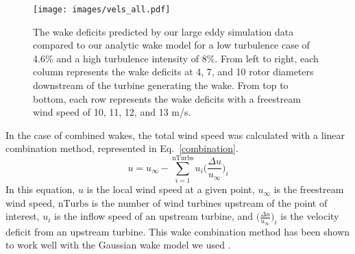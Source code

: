 \documentclass[11pt,letterpaper]{article}
\begin{document}
% 
\begin{figure}
    \centering
    \texttt{[image: images/vels\_all.pdf]}
    \caption{The wake deficits predicted by our large eddy simulation data compared to our analytic wake model for a low turbulence case of 4.6\% and a high turbulence intensity of 8\%. From left to right, each column represents the wake deficits at 4, 7, and 10 rotor diameters downstream of the turbine generating the wake. From top to bottom, each row represents the wake deficits with a freestream wind speed of 10, 11, 12, and 13 m/s.}
    \label{vels_all}
\end{figure}

In the case of combined wakes, the total wind speed was calculated with a linear combination method, represented in Eq.~\ref{combination}.
%
\begin{equation}
    \label{combination}
    u = u_\infty - \sum_{i=1}^\text{nTurbs} u_i \Big(\frac{\Delta u}{u_{\infty}}\Big)_i
\end{equation}
% 
In this equation, $u$ is the local wind speed at a given point, $u_\infty$ is the freestream wind speed, $\text{nTurbs}$ is the number of wind turbines upstream of the point of interest, $u_i$ is the inflow speed of an upstream turbine, and $\Big(\frac{\Delta u}{u_{\infty}}\Big)_i$ is the velocity deficit from an upstream turbine. This wake combination method has been shown to work well with the Gaussian wake model we used \cite{niayifar2016analytical}.
\end{document}
